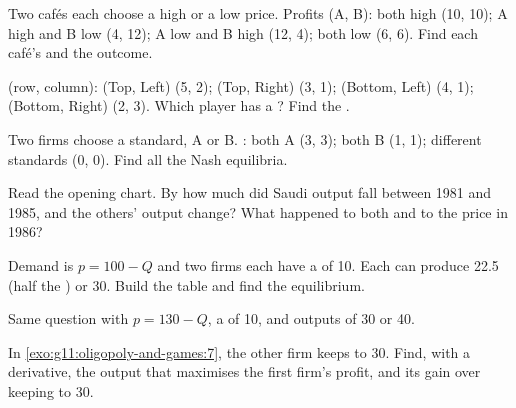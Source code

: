 \begin{exercise}[$\star$]\label{exo:g11:oligopoly-and-games:2}
Two cafés each choose a high or a low price. Profits (A, B): both high (10, 10); A high and B low (4, 12); A low and B high (12, 4); both low (6, 6). Find each café's
 and the outcome.
\end{exercise}

\begin{exercise}[$\star$]\label{exo:g11:oligopoly-and-games:3}
 (row, column): (Top, Left) (5, 2); (Top, Right) (3, 1); (Bottom, Left) (4, 1); (Bottom, Right) (2, 3). Which player has a ? Find the .
\end{exercise}

\begin{exercise}[$\star$]\label{exo:g11:oligopoly-and-games:4}
Two firms choose a standard, A or B. : both A (3, 3); both B (1, 1); different standards (0, 0). Find all the Nash equilibria.
\end{exercise}

\begin{exercise}[$\star$]\label{exo:g11:oligopoly-and-games:5}
Read the opening chart. By how much did Saudi output fall between 1981 and 1985, and the others' output change? What happened to both and to the price in 1986?
\end{exercise}

\begin{exercise}[$\star\star$]\label{exo:g11:oligopoly-and-games:6}
Demand is $p = 100 - Q$ and two firms each have a  of 10. Each can produce 22.5 (half the ) or 30. Build the  table and find the
equilibrium.
\end{exercise}

\begin{exercise}[$\star\star$]\label{exo:g11:oligopoly-and-games:7}
Same question with $p = 130 - Q$, a  of 10, and outputs of 30 or 40.
\end{exercise}

\begin{exercise}[$\star\star$]\label{exo:g11:oligopoly-and-games:8}
In \cref{exo:g11:oligopoly-and-games:7}, the other firm keeps to 30. Find, with a derivative, the output that maximises the first firm's profit, and its gain over
keeping to 30.
\end{exercise}


